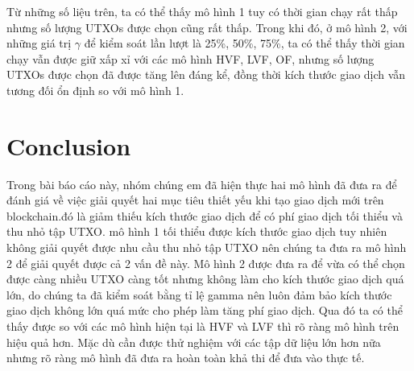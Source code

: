 \documentclass[a4paper]{article}
\begin{document}
Từ những số liệu trên, ta có thể thấy mô hình 1 tuy có thời gian chạy rất thấp nhưng số lượng UTXOs được chọn cũng rất thấp. Trong khi đó, ở mô hình 2, với những giá trị $\gamma$ để kiểm soát lần lượt là 25\%, 50\%, 75\%, ta có thể thấy thời gian chạy vẫn được giữ xấp xỉ với các mô hình HVF, LVF, OF, nhưng số lượng UTXOs được chọn đã được tăng lên đáng kể, đồng thời kích thước giao dịch vẫn tương đối ổn định so với mô hình 1.
\section{Conclusion}

Trong bài báo cáo này, nhóm chúng em đã hiện thực hai mô hình đã đưa ra để đánh giá về việc giải quyết hai mục tiêu thiết yếu khi tạo giao dịch mới trên blockchain.đó là giảm thiếu kích thước giao dịch để có phí giao dịch tối thiểu và thu nhỏ tập UTXO. mô hình 1 tối thiểu được kích thước giao dịch tuy nhiên không giải quyết được nhu cầu thu nhỏ tập UTXO nên chúng ta đưa ra mô hình 2 để giải quyết được cả 2 vấn đề này. Mô hình 2 được đưa ra để vừa có thể chọn được càng nhiều UTXO càng tốt nhưng không làm cho kích thước giao dịch quá lớn, do chúng ta đã kiểm soát bằng tỉ lệ gamma nên luôn đảm bảo kích thước giao dịch không lớn quá mức cho phép làm tăng phí giao dịch. Qua đó ta có thể thấy được so với các mô hình hiện tại là HVF và LVF thì rõ ràng mô hình trên hiệu quả hơn. Mặc dù cần được thử nghiệm với các tập dữ liệu lớn hơn nữa  nhưng rõ ràng mô hình đã đưa ra hoàn toàn khả thi để đưa vào thực tế.
\end{document}
